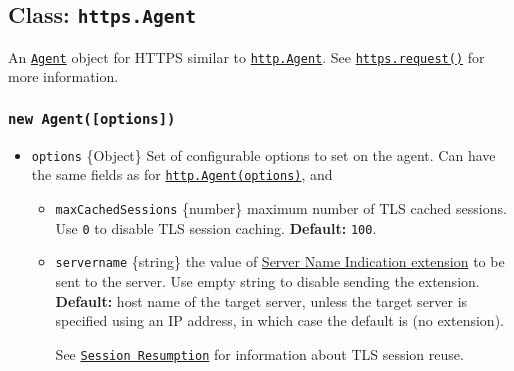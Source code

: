 \begin{Shaded}
\begin{Highlighting}[]
\OperatorTok{;}
\NormalTok{ \{}
\OperatorTok{=}  \NormalTok{(}\NormalTok{)}\OperatorTok{;}
\NormalTok{\} }
  \NormalTok{(}\NormalTok{)}\OperatorTok{;}
\NormalTok{\}}
\end{Highlighting}
\end{Shaded}

\subsection{\texorpdfstring{Class:
\texttt{https.Agent}}{Class: https.Agent}}\label{class-https.agent}

An \hyperref[class-httpsagent]{\texttt{Agent}} object for HTTPS similar
to \href{http.md\#class-httpagent}{\texttt{http.Agent}}. See
\hyperref[httpsrequestoptions-callback]{\texttt{https.request()}} for
more information.

\subsubsection{\texorpdfstring{\texttt{new\ Agent({[}options{]})}}{new Agent({[}options{]})}}\label{new-agentoptions}

\begin{itemize}
\tightlist
\item
  \texttt{options} \{Object\} Set of configurable options to set on the
  agent. Can have the same fields as for
  \href{http.md\#new-agentoptions}{\texttt{http.Agent(options)}}, and

  \begin{itemize}
  \item
    \texttt{maxCachedSessions} \{number\} maximum number of TLS cached
    sessions. Use \texttt{0} to disable TLS session caching.
    \textbf{Default:} \texttt{100}.
  \item
    \texttt{servername} \{string\} the value of
    \href{https://en.wikipedia.org/wiki/Server_Name_Indication}{Server
    Name Indication extension} to be sent to the server. Use empty
    string \texttt{\textquotesingle{}\textquotesingle{}} to disable
    sending the extension. \textbf{Default:} host name of the target
    server, unless the target server is specified using an IP address,
    in which case the default is
    \texttt{\textquotesingle{}\textquotesingle{}} (no extension).

    See \href{tls.md\#session-resumption}{\texttt{Session\ Resumption}}
    for information about TLS session reuse.
  \end{itemize}
\end{itemize}

